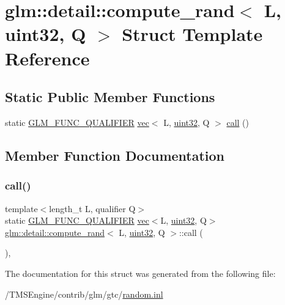 \hypertarget{structglm_1_1detail_1_1compute__rand_3_01_l_00_01uint32_00_01_q_01_4}{}\section{glm\+:\+:detail\+:\+:compute\+\_\+rand$<$ L, uint32, Q $>$ Struct Template Reference}
\label{structglm_1_1detail_1_1compute__rand_3_01_l_00_01uint32_00_01_q_01_4}
\subsection*{Static Public Member Functions}
\begin{DoxyCompactItemize}
\item 
static \hyperlink{setup_8hpp_a33fdea6f91c5f834105f7415e2a64407}{G\+L\+M\+\_\+\+F\+U\+N\+C\+\_\+\+Q\+U\+A\+L\+I\+F\+I\+ER} \hyperlink{structglm_1_1vec}{vec}$<$ L, \hyperlink{namespaceglm_1_1detail_ade6cfbf377022aaa391af8cd50489222}{uint32}, Q $>$ \hyperlink{structglm_1_1detail_1_1compute__rand_3_01_l_00_01uint32_00_01_q_01_4_a3f7bf8e5c44f275c59678a82cc6087ea}{call} ()
\end{DoxyCompactItemize}


\subsection{Member Function Documentation}
\mbox{\label{structglm_1_1detail_1_1compute__rand_3_01_l_00_01uint32_00_01_q_01_4_a3f7bf8e5c44f275c59678a82cc6087ea}} 
\subsubsection{\texorpdfstring{call()}{call()}}
{\footnotesize\ttfamily template$<$length\+\_\+t L, qualifier Q$>$ \\
static \hyperlink{setup_8hpp_a33fdea6f91c5f834105f7415e2a64407}{G\+L\+M\+\_\+\+F\+U\+N\+C\+\_\+\+Q\+U\+A\+L\+I\+F\+I\+ER} \hyperlink{structglm_1_1vec}{vec}$<$L, \hyperlink{namespaceglm_1_1detail_ade6cfbf377022aaa391af8cd50489222}{uint32}, Q$>$ \hyperlink{structglm_1_1detail_1_1compute__rand}{glm\+::detail\+::compute\+\_\+rand}$<$ L, \hyperlink{namespaceglm_1_1detail_ade6cfbf377022aaa391af8cd50489222}{uint32}, Q $>$\+::call (\begin{DoxyParamCaption}{ }\end{DoxyParamCaption})\hspace{0.3cm}{\ttfamily [inline]}, {\ttfamily [static]}}



The documentation for this struct was generated from the following file\+:\begin{DoxyCompactItemize}
\item 
/\+T\+M\+S\+Engine/contrib/glm/gtc/\hyperlink{random_8inl}{random.\+inl}\end{DoxyCompactItemize}
